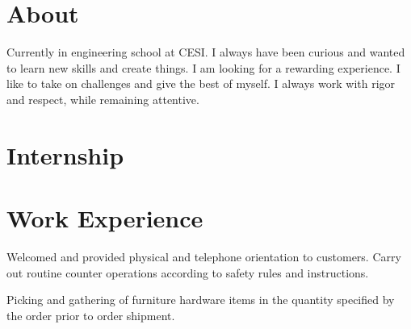 \documentclass[a4paper,table]{twentysecondcv}
\begin{document}
\section{About}

Currently in engineering school at CESI. I always have been curious and wanted to learn new skills and create things. I am looking for a rewarding experience. I like to take on challenges and give the best of myself. I always work with rigor and respect, while remaining attentive.

\section{Internship}

\begin{twenty}


\end{twenty}

\vspace{-0.4cm}

\section{Work Experience}

\begin{twenty}

{Welcomed and provided physical and telephone orientation to customers. Carry out routine counter operations according to safety rules and instructions.}

{Picking and gathering of furniture hardware items in the quantity specified by the order prior to order shipment.}

\end{twenty}

\vspace{-0.4cm}
\end{document}
